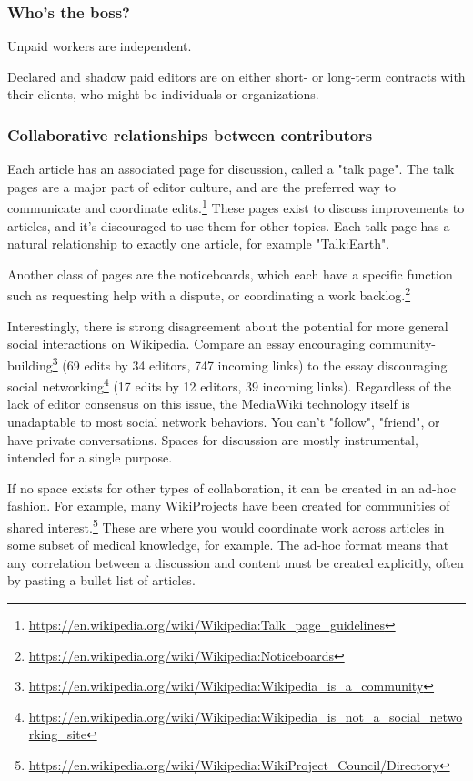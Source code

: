 \subsubsection{Who's the boss?}

Unpaid workers are independent.

Declared and shadow paid editors are on either short- or long-term contracts with their clients, who might be individuals or organizations.  

\subsubsection{Collaborative relationships between contributors}

Each article has an associated page for discussion, called a "talk page".  The talk pages are a major part of editor culture, and are the preferred way to communicate and coordinate edits.\footnote{\url{https://en.wikipedia.org/wiki/Wikipedia:Talk_page_guidelines}}  These pages exist to discuss improvements to articles, and it's discouraged to use them for other topics.  Each talk page has a natural relationship to exactly one article, for example "Talk:Earth".

Another class of pages are the noticeboards, which each have a specific function such as requesting help with a dispute, or coordinating a work backlog.\footnote{\url{https://en.wikipedia.org/wiki/Wikipedia:Noticeboards}}

Interestingly, there is strong disagreement about the potential for more general social interactions on Wikipedia.  Compare an essay encouraging community-building\footnote{\url{https://en.wikipedia.org/wiki/Wikipedia:Wikipedia_is_a_community}} (69 edits by 34 editors, 747 incoming links) to the essay discouraging social networking\footnote{\url{https://en.wikipedia.org/wiki/Wikipedia:Wikipedia_is_not_a_social_networking_site}} (17 edits by 12 editors, 39 incoming links).  Regardless of the lack of editor consensus on this issue, the MediaWiki technology itself is unadaptable to most social network behaviors.  You can't "follow", "friend", or have private conversations.  Spaces for discussion are mostly instrumental, intended for a single purpose.

If no space exists for other types of collaboration, it can be created in an ad-hoc fashion.  For example, many WikiProjects have been created for communities of shared interest.\footnote{\url{https://en.wikipedia.org/wiki/Wikipedia:WikiProject_Council/Directory}}  These are where you would coordinate work across articles in some subset of medical knowledge, for example.  The ad-hoc format means that any correlation between a discussion and content must be created explicitly, often by pasting a bullet list of articles.

